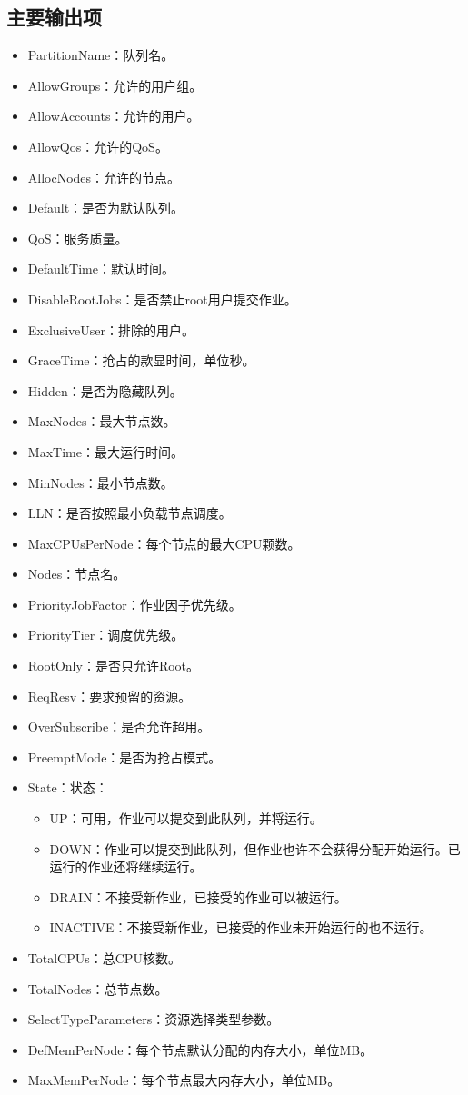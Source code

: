 \subsection{主要输出项}
\begin{itemize}
	\item PartitionName：队列名。
	\item AllowGroups：允许的用户组。
	\item AllowAccounts：允许的用户。
	\item AllowQos：允许的QoS。
	\item AllocNodes：允许的节点。
	\item Default：是否为默认队列。
	\item QoS：服务质量。
	\item DefaultTime：默认时间。
	\item DisableRootJobs：是否禁止root用户提交作业。
	\item ExclusiveUser：排除的用户。
	\item GraceTime：抢占的款显时间，单位秒。
	\item Hidden：是否为隐藏队列。
	\item MaxNodes：最大节点数。
	\item MaxTime：最大运行时间。
	\item MinNodes：最小节点数。
	\item LLN：是否按照最小负载节点调度。
	\item MaxCPUsPerNode：每个节点的最大CPU颗数。
	\item Nodes：节点名。
	\item PriorityJobFactor：作业因子优先级。
	\item PriorityTier：调度优先级。
	\item RootOnly：是否只允许Root。
	\item ReqResv：要求预留的资源。
	\item OverSubscribe：是否允许超用。
	\item PreemptMode：是否为抢占模式。
\newpage
	\item State：状态：
\begin{itemize}
	\item UP：可用，作业可以提交到此队列，并将运行。
   	\item DOWN：作业可以提交到此队列，但作业也许不会获得分配开始运行。已运行的作业还将继续运行。
   	\item DRAIN：不接受新作业，已接受的作业可以被运行。
   	\item INACTIVE：不接受新作业，已接受的作业未开始运行的也不运行。
\end{itemize}
	\item TotalCPUs：总CPU核数。
	\item TotalNodes：总节点数。
	\item SelectTypeParameters：资源选择类型参数。
	\item DefMemPerNode：每个节点默认分配的内存大小，单位MB。
	\item MaxMemPerNode：每个节点最大内存大小，单位MB。
\end{itemize}

